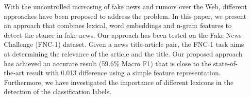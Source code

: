 With the uncontrolled increasing of fake news and rumors over the Web, different approaches have been proposed to address the problem. In this paper, we present an approach that combines lexical, word embeddings and n-gram features to detect the stance in fake news. Our approach has been tested on the Fake News Challenge (FNC-1) dataset. Given a news title-article pair, the FNC-1 task aims at determining the relevance of the article and the title. Our proposed approach has achieved an accurate result (59.6\% Macro F1) that is close to the state-of-the-art result with 0.013 difference using a simple feature representation. Furthermore, we have investigated the importance of different lexicons in the detection of the classification labels.
